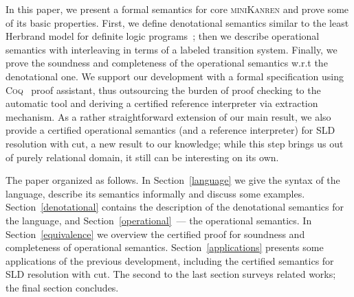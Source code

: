 
In this paper, we present a formal semantics for core \textsc{miniKanren} and prove some of its basic properties. First,
we define denotational semantics similar to the least Herbrand model for definite logic programs~\cite{LHM}; then
we describe operational semantics with interleaving in terms of a labeled transition system. Finally, we prove the soundness and
completeness of the operational semantics w.r.t the denotational one. We support our development with a formal specification
using \textsc{Coq}~\cite{Coq} proof assistant, thus outsourcing the burden of proof checking to the automatic tool and
deriving a certified reference interpreter via extraction mechanism. As a rather straightforward extension of our
main result, we also provide a certified operational semantics (and a reference interpreter) for SLD resolution with cut, a new result
to our knowledge; while this step brings us out of purely relational domain, it still can be interesting on its own.


The paper organized as follows. In Section~\ref{language} we give the syntax of the language, describe its semantics
informally and discuss some examples. Section~\ref{denotational} contains the description of the denotational semantics for
the language, and Section~\ref{operational}~--- the operational semantics. In Section~\ref{equivalence} we overview the
certified proof for soundness and completeness of operational semantics. Section~\ref{applications} presents some applications of
the previous development, including the certified semantics for SLD resolution with cut. The second to the last section
surveys related works; the final section concludes.
